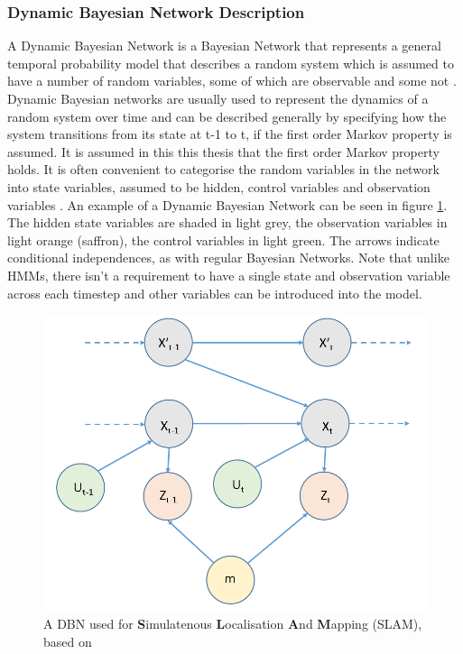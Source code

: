 \subsubsection{Dynamic Bayesian Network Description}
A Dynamic Bayesian Network is a Bayesian Network that represents a general temporal probability model that describes a random system which is assumed to have a number of random variables, some of which are observable and some not \cite{AIAMA}. Dynamic Bayesian networks are usually used to represent the dynamics of a random system over time and can be described generally by specifying how the system transitions from its state at t-1 to t, if the first order Markov property is assumed. It is assumed in this this thesis that the first order Markov property holds. It is often convenient to categorise the random variables in the network into state variables, assumed to be hidden, control variables and observation variables . An example of a Dynamic Bayesian Network can be seen in figure \ref{fig:2TDBNExample}. The hidden state variables are shaded in light grey, the observation variables in light orange (saffron), the control variables in light green. The arrows indicate conditional independences, as with regular Bayesian Networks. Note that unlike HMMs, there isn't a requirement to have a single state and observation variable across each timestep and other variables can be introduced into the model.

\begin{figure}
    \centering
    \includegraphics[width = 0.5\linewidth]{Chapters/MultiAgentTargetDetection/BayesianFiltering/Figs/DBNs/Complex2TDBN.PNG}
    \caption{A DBN used for \textbf{S}imulatenous \textbf{L}ocalisation \textbf{A}nd \textbf{M}apping (SLAM), based on \cite[p.~311]{Thrun:2005:ProbabilisticRobotics}}
    \label{fig:2TDBNExample}
\end{figure}










